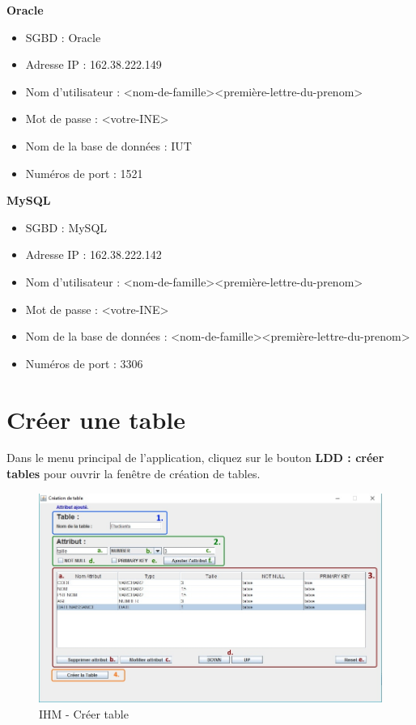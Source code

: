 \textbf{Oracle}
\begin{itemize}
\item SGBD : Oracle
\item Adresse IP : 162.38.222.149
\item Nom d'utilisateur : <nom-de-famille><première-lettre-du-prenom>
\item Mot de passe : <votre-INE>
\item Nom de la base de données : IUT
\item Numéros de port : 1521 \\
\end{itemize}

\textbf{MySQL}
\begin{itemize}
\item SGBD : MySQL
\item Adresse IP : 162.38.222.142
\item Nom d'utilisateur : <nom-de-famille><première-lettre-du-prenom>
\item Mot de passe : <votre-INE>
\item Nom de la base de données : <nom-de-famille><première-lettre-du-prenom>
\item Numéros de port : 3306
\end{itemize}

\section{Créer une table}
Dans le menu principal de l'application, cliquez sur le bouton \textbf{LDD : créer tables} pour ouvrir la fen\^etre de création de tables.

\begin{figure}[!h]
\centering
\includegraphics[width=14cm]{./images/manuel/creer_table.jpg}
\caption{IHM - Créer table}
\label{creer_table}
\end{figure}

